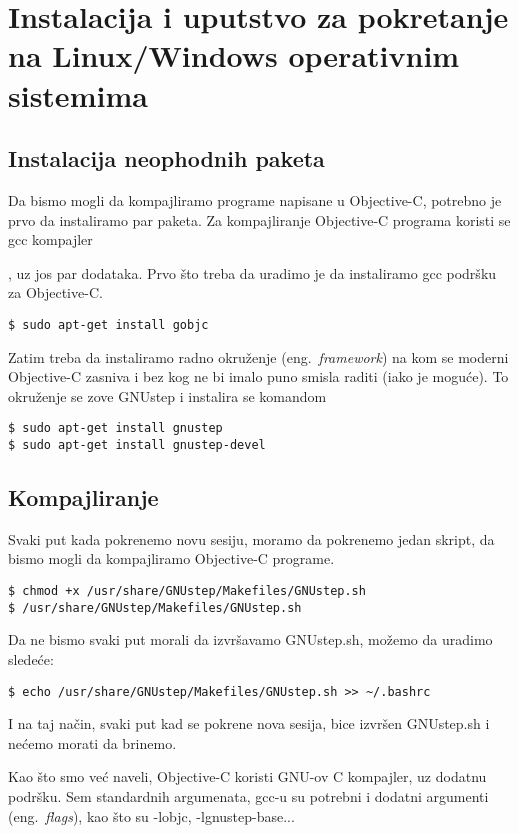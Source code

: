 \documentclass[a4paper]{article}
\begin{document}
\section{Instalacija i uputstvo za pokretanje na Linux/Windows operativnim sistemima}
\label{sec:instalacija}
\subsection{Instalacija neophodnih paketa}
Da bismo mogli da kompajliramo programe napisane u Objective-C, potrebno je prvo da instaliramo
par paketa. Za kompajliranje Objective-C programa koristi se gcc kompajler{\cite{gcc}, uz jos par
dodataka.
Prvo što treba da uradimo je da instaliramo gcc podršku za Objective-C.

\begin{lstlisting}[frame=single]
$ sudo apt-get install gobjc
\end{lstlisting}

Zatim treba da instaliramo radno okruženje (eng.~{\em framework}) na kom se moderni Objective-C zasniva i bez kog
ne bi imalo puno smisla raditi (iako je moguće).
To okruženje se zove GNUstep i instalira se komandom

\begin{lstlisting}[frame=single]
$ sudo apt-get install gnustep
$ sudo apt-get install gnustep-devel
\end{lstlisting}

\subsection{Kompajliranje}
Svaki put kada pokrenemo novu sesiju, moramo da pokrenemo jedan skript, da bismo mogli da kompajliramo Objective-C programe.
\begin{lstlisting}[frame=single]
$ chmod +x /usr/share/GNUstep/Makefiles/GNUstep.sh
$ /usr/share/GNUstep/Makefiles/GNUstep.sh
\end{lstlisting}

Da ne bismo svaki put morali da izvršavamo GNUstep.sh, možemo da uradimo sledeće:

\begin{lstlisting}[frame=single]
$ echo /usr/share/GNUstep/Makefiles/GNUstep.sh >> ~/.bashrc
\end{lstlisting}

I na taj način, svaki put kad se pokrene nova sesija, bice izvršen GNUstep.sh i nećemo morati da brinemo.

Kao što smo već naveli, Objective-C koristi GNU-ov C kompajler, uz dodatnu
podršku.
Sem standardnih argumenata, gcc-u su potrebni i dodatni argumenti (eng.~{\em flags}), kao što su -lobjc, -lgnustep-base...

}
\end{document}
